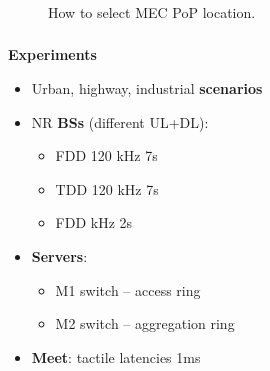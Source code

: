 \documentclass[aspectratio=169]{beamer}
\begin{document}
\begin{frame}
    \frametitle{\secname}
    \framesubtitle{\subsecname}

    \begin{figure}
        \centering
        \caption{How to select MEC PoP location.}
        \label{fig:algo-pop-location}
    \end{figure}
\end{frame}




\begin{frame}
    \frametitle{\secname}
    \framesubtitle{\subsecname}
    \textbf{Experiments}
    \begin{itemize}
        \item Urban, highway, industrial \textbf{scenarios}
        \item NR \textbf{BSs} (different UL+DL):
            \begin{itemize}
                \item FDD 120 kHz 7s
                \item TDD 120 kHz 7s
                \item FDD  kHz 2s
            \end{itemize}
        \item \textbf{Servers}:
            \begin{itemize}
                \item M1 switch -- access ring
                \item M2 switch -- aggregation ring
            \end{itemize}
        \item \textbf{Meet}: tactile latencies 1ms
    \end{itemize}
\end{frame}
\end{document}
